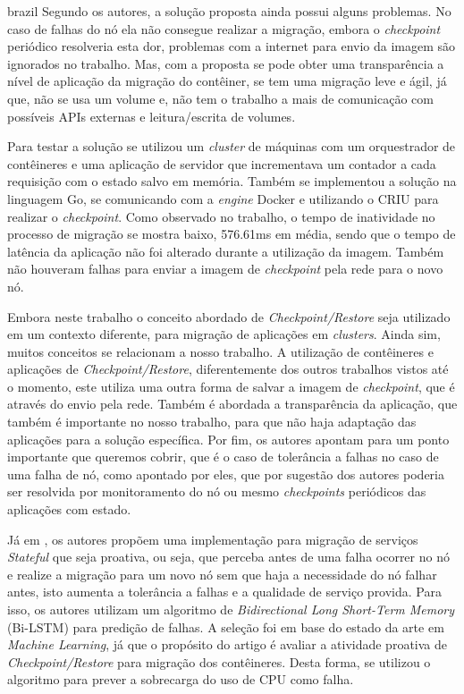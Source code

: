 \begin{otherlanguage*}{brazil}
Segundo os autores, a solução proposta ainda possui alguns problemas. No
caso de falhas do nó ela não consegue realizar a migração, embora o
\textit{checkpoint} periódico resolveria esta dor, problemas com a internet
para envio da imagem são ignorados no trabalho. Mas, com a proposta se pode obter uma
transparência a nível de aplicação da migração do contêiner, se tem uma
migração leve e ágil, já que, não se usa um volume e, não tem o trabalho
a mais de comunicação com possíveis APIs externas e leitura/escrita de volumes.

Para testar a solução se utilizou um \textit{cluster} de máquinas com um
orquestrador de contêineres e uma aplicação de servidor que incrementava
um contador a cada requisição com o estado salvo em memória. Também se
implementou a solução na linguagem Go, se comunicando com a \textit{engine}
Docker e utilizando o CRIU para realizar o \textit{checkpoint}. Como
observado no trabalho, o tempo de inatividade no processo de migração se
mostra baixo, 576.61ms em média, sendo que o tempo de latência da aplicação
não foi alterado durante a utilização da imagem. Também não houveram
falhas para enviar a imagem de \textit{checkpoint} pela rede para o novo nó.

Embora neste trabalho o conceito abordado de \textit{Checkpoint/Restore}
seja utilizado em um contexto diferente, para migração de aplicações em
\textit{clusters}. Ainda sim, muitos conceitos se relacionam a nosso trabalho.
A utilização de contêineres e aplicações de \textit{Checkpoint/Restore},
diferentemente dos outros trabalhos vistos até o momento, este utiliza uma
outra forma de salvar a imagem de \textit{checkpoint}, que é através do envio
pela rede. Também é abordada a transparência da aplicação, que também é
importante no nosso trabalho, para que não haja adaptação das aplicações
para a solução específica. Por fim, os autores apontam para um ponto
importante que queremos cobrir, que é o caso de tolerância a falhas no caso
de uma falha de nó, como apontado por eles, que por sugestão dos autores
poderia ser resolvida por monitoramento do nó ou mesmo \textit{checkpoints}
periódicos das aplicações com estado.

Já em \cite{tran2022proactive}, os autores propõem uma implementação
para migração de serviços \textit{Stateful} que seja proativa, ou seja,
que perceba antes de uma falha ocorrer no nó e realize a migração para
um novo nó sem que haja a necessidade do nó falhar antes, isto aumenta
a tolerância a falhas e a qualidade de serviço provida. Para isso, os
autores utilizam um algoritmo de \textit{Bidirectional Long Short-Term
Memory} (Bi-LSTM) para predição de falhas. A seleção foi em base do estado
da arte em \textit{Machine Learning}, já que o propósito do artigo é
avaliar a atividade proativa de \textit{Checkpoint/Restore} para
migração dos contêineres. Desta forma, se utilizou o algoritmo para prever
a sobrecarga do uso de CPU como falha.


\end{otherlanguage*}
